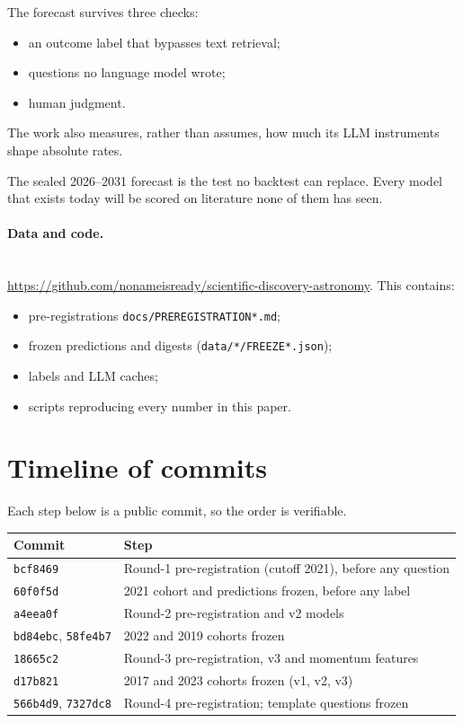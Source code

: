 \documentclass[11pt]{article}
\begin{document}
The forecast survives three checks:
\begin{itemize}
\item an outcome label that bypasses text retrieval;
\item questions no language model wrote;
\item human judgment.
\end{itemize}
The work also measures, rather than assumes, how much its LLM instruments
shape absolute rates.

The sealed 2026--2031 forecast is the test no backtest can replace. Every
model that exists today will be scored on literature none of them has seen.

\paragraph{Data and code.}\leavevmode\\
\url{https://github.com/nonameisready/scientific-discovery-astronomy}.
This contains:
\begin{itemize}
\item pre-registrations \texttt{docs/PREREGISTRATION*.md};
\item frozen predictions and digests (\texttt{data/*/FREEZE*.json});
\item labels and LLM caches;
\item scripts reproducing every number in this paper.
\end{itemize}




\appendix
\section{Timeline of commits}\label{app:timeline}
Each step below is a public commit, so the order is verifiable.

\begin{center}
\small
\begin{tabular}{@{}ll@{}}
\toprule
Commit & Step \\
\midrule
\texttt{bcf8469} & Round-1 pre-registration (cutoff 2021), before any question \\
\texttt{60f0f5d} & 2021 cohort and predictions frozen, before any label \\
\texttt{a4eea0f} & Round-2 pre-registration and v2 models \\
\texttt{bd84ebc}, \texttt{58fe4b7} & 2022 and 2019 cohorts frozen \\
\texttt{18665c2} & Round-3 pre-registration, v3 and momentum features \\
\texttt{d17b821} & 2017 and 2023 cohorts frozen (v1, v2, v3) \\
\texttt{566b4d9}, \texttt{7327dc8} & Round-4 pre-registration; template questions frozen \\
\bottomrule
\end{tabular}
\end{center}
\end{document}
